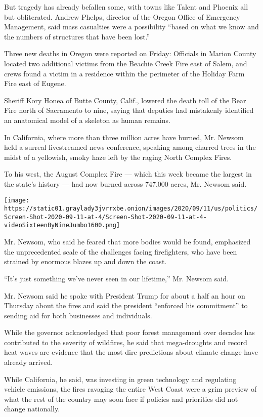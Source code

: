 But tragedy has already befallen some, with towns like Talent and
Phoenix all but obliterated. Andrew Phelps, director of the Oregon
Office of Emergency Management, said mass casualties were a possibility
``based on what we know and the numbers of structures that have been
lost.''

Three new deaths in Oregon were reported on Friday: Officials in Marion
County located two additional victims from the Beachie Creek Fire east
of Salem, and crews found a victim in a residence within the perimeter
of the Holiday Farm Fire east of Eugene.

Sheriff Kory Honea of Butte County, Calif., lowered the death toll of
the Bear Fire north of Sacramento to nine, saying that deputies had
mistakenly identified an anatomical model of a skeleton as human
remains.

In California, where more than three million acres have burned, Mr.
Newsom held a surreal livestreamed news conference, speaking among
charred trees in the midst of a yellowish, smoky haze left by the raging
North Complex Fires.

To his west, the August Complex Fire --- which this week became the
largest in the state's history --- had now burned across 747,000 acres,
Mr. Newsom said.

\texttt{[image: https://static01.graylady3jvrrxbe.onion/images/2020/09/11/us/politics/Screen-Shot-2020-09-11-at-4/Screen-Shot-2020-09-11-at-4-videoSixteenByNineJumbo1600.png]}

Mr. Newsom, who said he feared that more bodies would be found,
emphasized the unprecedented scale of the challenges facing
firefighters, who have been strained by enormous blazes up and down the
coast.

``It's just something we've never seen in our lifetime,'' Mr. Newsom
said.

Mr. Newsom said he spoke with President Trump for about a half an hour
on Thursday about the fires and said the president ``enforced his
commitment'' to sending aid for both businesses and individuals.

While the governor acknowledged that poor forest management over decades
has contributed to the severity of wildfires, he said that mega-droughts
and record heat waves are evidence that the most dire predictions about
climate change have already arrived.

While California, he said, was investing in green technology and
regulating vehicle emissions, the fires ravaging the entire West Coast
were a grim preview of what the rest of the country may soon face if
policies and priorities did not change nationally.

